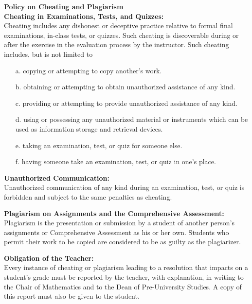 \documentclass[10pt]{article}
\begin{document}
\setlength{\columnsep}{30pt}
\begin{multicols}{2}

\large{\textbf{Policy on Cheating and Plagiarism}}\\
\vspace{-0.15in}\hline \bigskip \normalsize
\textbf{Cheating in Examinations, Tests, and Quizzes:}\\
Cheating includes any dishonest or deceptive practice relative to
formal final examinations, in-class tests, or quizzes. Such cheating
is discoverable during or after the exercise in the evaluation
process by the instructor. Such cheating includes, but is not limited
to\vspace{-0.1in}
\begin{enumerate}\addtolength{\itemsep}{-0.5\baselineskip}
\item[a.] copying or attempting to copy another's work.
\item[b.] obtaining or attempting to obtain unauthorized assistance of any kind.
\item[c.] providing or attempting to provide unauthorized assistance of any kind.
\item[d.] using or possessing any unauthorized material or instruments which can be used as information storage and retrieval devices.
\item[e.] taking an examination, test, or quiz for someone else.
\item[f.] having someone take an examination, test, or quiz in one's place. \smallskip
\end{enumerate}\vspace{-0.1in}

\textbf{Unauthorized Communication:}\\
Unauthorized communication of any kind during an examination,
test, or quiz is forbidden and subject to the same penalties as
cheating.\\\vspace{-0.1in}

\textbf{Plagiarism on Assignments and the Comprehensive Assessment:}\\
Plagiarism is the presentation or submission by a student of
another person's assignments or Comprehensive Assessment as his or
her own. Students who permit their work to be copied are considered
to be as guilty as the plagiarizer.\\\vspace{-0.1in}

\textbf{Obligation of the Teacher:}\\
Every instance of cheating or plagiarism leading to a resolution
that impacts on a student's grade must be reported by the teacher,
with explanation, in writing to the Chair of Mathematics and to the
Dean of Pre-University Studies. A copy of this report must also be
given to the student.\\\vspace{-0.1in}


\end{multicols}
\end{document}
